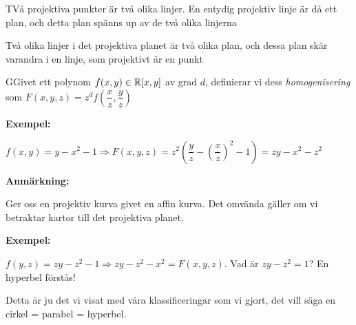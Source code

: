 \par\bigskip
\begin{prf}
  TVå projektiva punkter är två olika linjer. En entydig projektiv linje är då ett plan, och detta plan spänns up av de två olika linjerna
  \par\bigskip
  \noindent Två olika linjer i det projektiva planet är två olika plan, och dessa plan skär varandra i en linje, som projektivt är en punkt
\end{prf}
\par\bigskip
\begin{theo}
  GGivet ett polynom $f(x,y)\in\mathbb{R}[x,y]$ av grad $d$, definierar vi dess \textit{homogenisering} som $F(x,y,z) = z^df\left(\dfrac{x}{z},\dfrac{y}{z}\right)$ 
\end{theo}
\par\bigskip
\noindent\textbf{Exempel:}\par
\noindent $f(x,y) = y-x^2-1\Rightarrow F(x,y,z) = z^2\left(\dfrac{y}{z}-\left(\dfrac{x}{z}\right)^2-1\right) = zy-x^2-z^2$
\par\bigskip
\noindent\textbf{Anmärkning:}\par
\noindent Ger oss en projektiv kurva givet en affin kurva. Det omvända gäller om vi betraktar kartor till det projektiva planet.
\par\bigskip
\noindent\textbf{Exempel:}\par
\noindent $f(y,z)=zy-z^2-1\Rightarrow zy-z^2-x^2=F(x,y,z)$. Vad är $zy-z^2=1$? En hyperbel förstås!\par
\noindent Detta är ju det vi visat med våra klassificeringar som vi gjort, det vill säga en cirkel = parabel = hyperbel.
